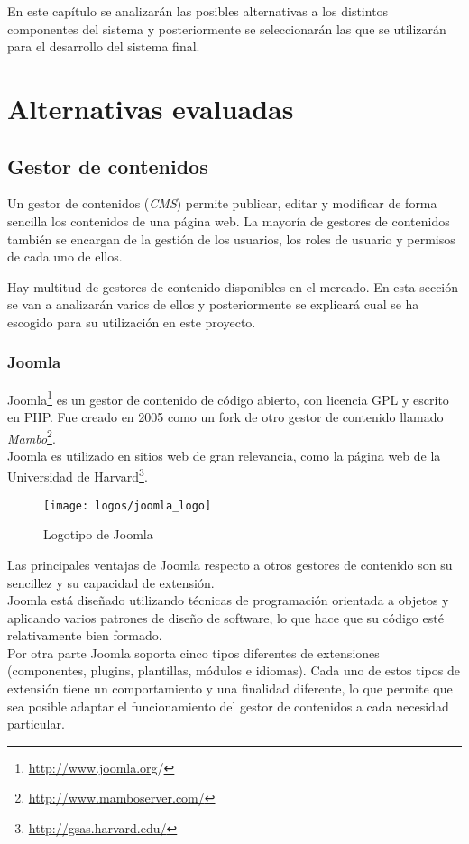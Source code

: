 En este capítulo se analizarán las posibles alternativas a los distintos componentes del sistema y posteriormente se seleccionarán las que se utilizarán para el desarrollo del sistema final.

\section{Alternativas evaluadas}

\subsection{Gestor de contenidos}
Un gestor de contenidos (\textit{CMS}) permite publicar, editar y modificar de forma sencilla los contenidos de una página web.  La mayoría de gestores de contenidos también se encargan de la gestión de los usuarios, los roles de usuario y permisos de cada uno de ellos.

Hay multitud de gestores de contenido disponibles en el mercado. En esta sección se van a analizarán varios de ellos y posteriormente se explicará cual se ha escogido para su utilización en este proyecto.


\subsubsection{Joomla}
Joomla\footnote{\url{http://www.joomla.org}/} es un gestor de contenido de código abierto, con licencia GPL y escrito en PHP.  Fue creado en 2005 como un fork de otro gestor de contenido llamado \textit{Mambo}\footnote{\url{http://www.mamboserver.com/}}.\\
Joomla es utilizado en sitios web de gran relevancia, como la página web de la Universidad de Harvard\footnote{\url{http://gsas.harvard.edu/}}.

\begin{figure}[h]
\centering
\texttt{[image: logos/joomla\_logo]}
\caption{Logotipo de Joomla}
\end{figure}

Las principales ventajas de Joomla respecto a otros gestores de contenido son su sencillez y su capacidad de extensión.\\
Joomla está diseñado utilizando técnicas de programación orientada a objetos y aplicando varios patrones de diseño de software, lo que hace que su código esté relativamente bien formado.\\
Por otra parte Joomla soporta cinco tipos diferentes de extensiones (componentes, plugins, plantillas, módulos e idiomas).  Cada uno de estos tipos de extensión tiene un comportamiento y una finalidad diferente, lo que permite que sea posible adaptar el funcionamiento del gestor de contenidos a cada necesidad particular.


